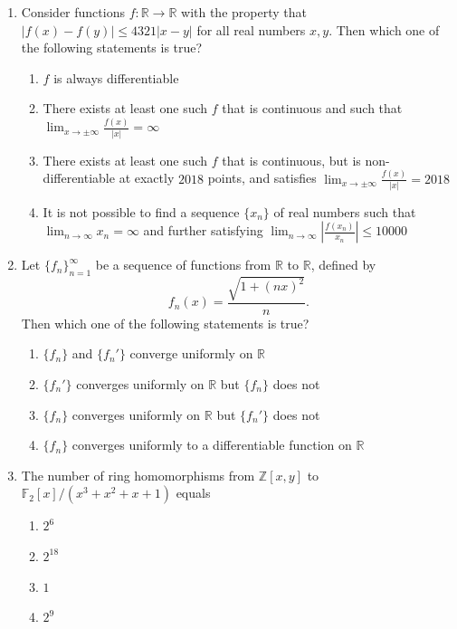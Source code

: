 \documentclass[11pt, a4paper]{article}
\begin{document}
\begin{enumerate}
  \item Consider functions $f: \mathbb{R} \to \mathbb{R}$ with the property that $|f(x) - f(y)| \le 4321 |x - y|$ for all real numbers $x, y$. Then which one of the following statements is true?
  \begin{enumerate}[label=(\alph*)]
    \item $f$ is always differentiable
    \item There exists at least one such $f$ that is continuous and such that $\lim_{x \to \pm\infty} \frac{f(x)}{|x|} = \infty$
    \item There exists at least one such $f$ that is continuous, but is non-differentiable at exactly $2018$ points, and satisfies $\lim_{x \to \pm\infty} \frac{f(x)}{|x|} = 2018$
    \item It is not possible to find a sequence $\{x_n\}$ of real numbers such that $\lim_{n \to \infty} x_n = \infty$ and further satisfying $\lim_{n \to \infty} \left|\frac{f(x_n)}{x_n}\right| \le 10000$
  \end{enumerate}

  \item Let $\{f_n\}_{n=1}^\infty$ be a sequence of functions from $\mathbb{R}$ to $\mathbb{R}$, defined by
  \[
    f_n(x) = \frac{\sqrt{1 + (nx)^2}}{n}.
  \]
  Then which one of the following statements is true?
  \begin{enumerate}[label=(\alph*)]
    \item $\{f_n\}$ and $\{f_n'\}$ converge uniformly on $\mathbb{R}$
    \item $\{f_n'\}$ converges uniformly on $\mathbb{R}$ but $\{f_n\}$ does not
    \item $\{f_n\}$ converges uniformly on $\mathbb{R}$ but $\{f_n'\}$ does not
    \item $\{f_n\}$ converges uniformly to a differentiable function on $\mathbb{R}$
  \end{enumerate}

  \item The number of ring homomorphisms from $\mathbb{Z}[x, y]$ to $\mathbb{F}_2[x]/(x^3 + x^2 + x + 1)$ equals
  \begin{enumerate}[label=(\alph*)]
    \item $2^6$
    \item $2^{18}$
    \item $1$
    \item $2^9$
  \end{enumerate}


\end{enumerate}
\end{document}
